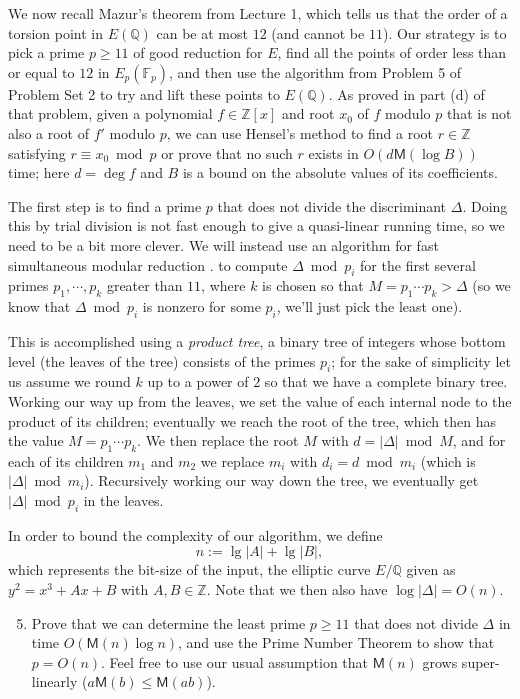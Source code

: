 \documentclass[11pt]{article}
\newcommand{\Fp}{\mathbb{F}_p}
\newcommand{\Q}{\mathbb{Q}}
\newcommand{\Z}{\mathbb{Z}}
\newcommand{\M}{\textsf{M}}
\begin{document}
We now recall Mazur's theorem from Lecture 1, which tells us that the order of a torsion point in $E(\Q)$ can be at most $12$ (and cannot be $11$).  Our strategy is to pick a prime $p \ge 11$ of good reduction for $E$, find all the points of order less than or equal to $12$ in $E_p(\Fp)$, and then use the algorithm from Problem 5 of Problem Set 2 to try and lift these points to $E(\Q)$.
As proved in part (d) of that problem, given a polynomial $f\in \Z[x]$ and root $x_0$ of $f$ modulo $p$ that is not also a root of $f'$ modulo $p$, we can use Hensel's method to find a root $r\in\Z$ satisfying $r\equiv x_0\bmod p$ or prove that no such $r$ exists in $O(d\M(\log B))$ time; here $d=\deg f$ and $B$ is a bound on the absolute values of its coefficients.

The first step is to find a prime $p$ that does not divide the discriminant $\Delta$.
Doing this by trial division is not fast enough to give a quasi-linear running time, so we need to be a bit more clever.
We will instead use an algorithm for fast simultaneous modular reduction \cite[Alg.\,10.16]{gg}. to compute $\Delta \bmod p_i$ for the first several primes $p_1,\cdots, p_k$ greater than $11$, where $k$ is chosen so that $M=p_1\cdots p_k>\Delta$ (so we know that $\Delta\bmod p_i$ is nonzero for some $p_i$, we'll just pick the least one).

This is accomplished using a \emph{product tree}, a binary tree of integers whose bottom level (the leaves of the tree) consists of the primes $p_i$; for the sake of simplicity let us assume we round $k$ up to a power of $2$ so that we have a complete binary tree.
Working our way up from the leaves, we set the value of each internal node to the product of its children; eventually we reach the root of the tree, which then has the value $M=p_1\cdots p_k$.
We then replace the root $M$ with $d=|\Delta|\bmod M$, and for each of its children $m_1$ and $m_2$ we replace $m_i$ with $d_i=d\bmod m_i$ (which is $|\Delta|\bmod m_i$).
Recursively working our way down the tree, we eventually get $|\Delta|\bmod p_i$ in the leaves.

In order to bound the complexity of our algorithm, we define
\[
n:=\lg|A|+\lg|B|,
\]
which represents the bit-size of the input, the elliptic curve $E/\Q$ given as $y^2=x^3+Ax+B$ with $A,B\in\Z$.
Note that we then also have $\log |\Delta| = O(n)$.

\begin{enumerate}[{\bf (a)}]
\setcounter{enumi}{4}
\item Prove that we can determine the least prime $p\ge 11$ that does not divide $\Delta$ in time $O(\M(n)\log n)$, and use the Prime Number Theorem to show that $p=O(n)$.
Feel free to use our usual assumption that $\M(n)$ grows super-linearly ($a\M(b)\le \M(ab)$).
\end{enumerate}
\end{document}
